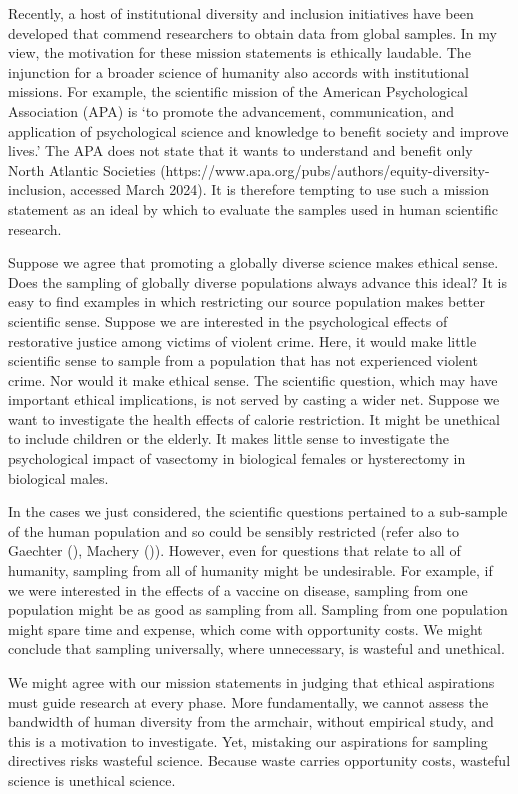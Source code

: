 \documentclass[
  single column]{article}
\begin{document}
Recently, a host of institutional diversity and inclusion initiatives
have been developed that commend researchers to obtain data from global
samples. In my view, the motivation for these mission statements is
ethically laudable. The injunction for a broader science of humanity
also accords with institutional missions. For example, the scientific
mission of the American Psychological Association (APA) is `to promote
the advancement, communication, and application of psychological science
and knowledge to benefit society and improve lives.' The APA does not
state that it wants to understand and benefit only North Atlantic
Societies (https://www.apa.org/pubs/authors/equity-diversity-inclusion,
accessed March 2024). It is therefore tempting to use such a mission
statement as an ideal by which to evaluate the samples used in human
scientific research.

Suppose we agree that promoting a globally diverse science makes ethical
sense. Does the sampling of globally diverse populations always advance
this ideal? It is easy to find examples in which restricting our source
population makes better scientific sense. Suppose we are interested in
the psychological effects of restorative justice among victims of
violent crime. Here, it would make little scientific sense to sample
from a population that has not experienced violent crime. Nor would it
make ethical sense. The scientific question, which may have important
ethical implications, is not served by casting a wider net. Suppose we
want to investigate the health effects of calorie restriction. It might
be unethical to include children or the elderly. It makes little sense
to investigate the psychological impact of vasectomy in biological
females or hysterectomy in biological males.

In the cases we just considered, the scientific questions pertained to a
sub-sample of the human population and so could be sensibly restricted
(refer also to Gaechter (), Machery
()). However, even for questions that
relate to all of humanity, sampling from all of humanity might be
undesirable. For example, if we were interested in the effects of a
vaccine on disease, sampling from one population might be as good as
sampling from all. Sampling from one population might spare time and
expense, which come with opportunity costs. We might conclude that
sampling universally, where unnecessary, is wasteful and unethical.

We might agree with our mission statements in judging that ethical
aspirations must guide research at every phase. More fundamentally, we
cannot assess the bandwidth of human diversity from the armchair,
without empirical study, and this is a motivation to investigate. Yet,
mistaking our aspirations for sampling directives risks wasteful
science. Because waste carries opportunity costs, wasteful science is
unethical science.
\end{document}
